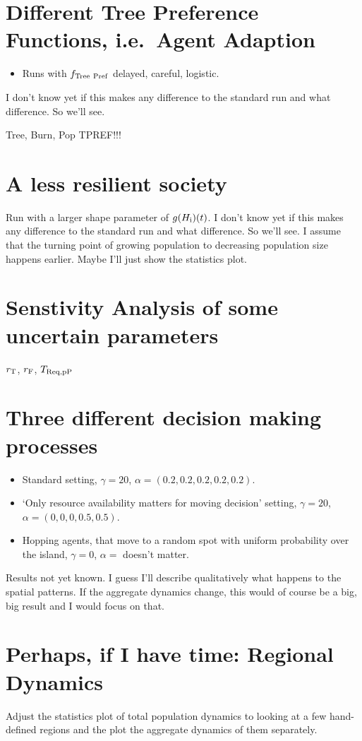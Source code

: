 \section{Different Tree Preference Functions, i.e.\ Agent Adaption}
\begin{itemize}
	\item Runs with $f_{\rm Tree \ Pref}$ delayed, careful, logistic.
\end{itemize}
I don't know yet if this makes any difference to the standard run and what difference. So we'll see.

Tree, Burn, Pop TPREF!!!


\section{A less resilient society}
Run with a larger shape parameter of $g(H_{\rm i})(t)$.
I don't know yet if this makes any difference to the standard run and what difference. So we'll see.
I assume that the turning point of growing population to decreasing population size happens earlier. Maybe I'll just show the statistics plot.


\section{Senstivity Analysis of some uncertain parameters}
$r_{\rm T}$, $r_{\rm F}$,
$T_{\rm Req, pP}$

\section{Three different decision making processes}
\begin{itemize}
	\item Standard setting, $\gamma=20$, $\alpha=(0.2,0.2,0.2,0.2,0.2)$.
	\item `Only resource availability matters for moving decision' setting, $\gamma=20$, $\alpha=(0, 0, 0, 0.5,0.5)$.
	\item Hopping agents, that move to a random spot with uniform probability over the island, $\gamma=0$, $\alpha=$ doesn't matter.
\end{itemize}
Results not yet known. I guess I'll describe qualitatively what happens to the spatial patterns. 
If the aggregate dynamics change, this would of course be a big, big result and I would focus on that.


\section{Perhaps, if I have time: Regional Dynamics}
Adjust the statistics plot of total population dynamics to looking at a few hand-defined regions and the plot the aggregate dynamics of them separately. 

